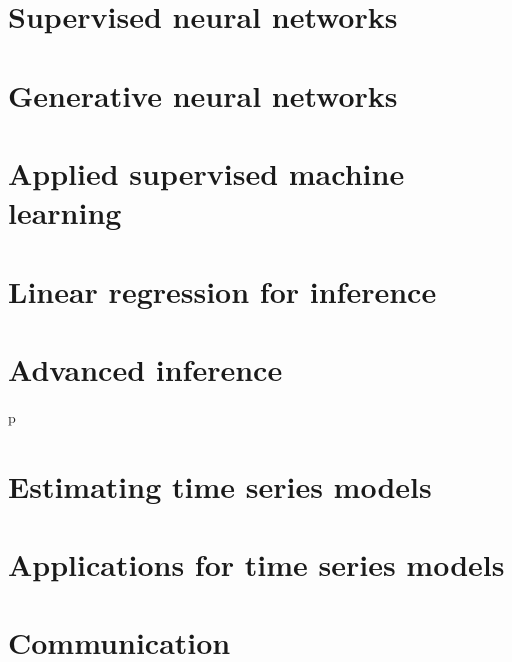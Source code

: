 \documentclass[oneside]{book}
\begin{document}
\part{Supervised neural networks}










\part{Generative neural networks}





\part{Applied supervised machine learning}





\part{Linear regression for inference}






\part{Advanced inference}



p





\part{Estimating time series models}










\part{Applications for time series models}







\part{Communication}






\end{document}
